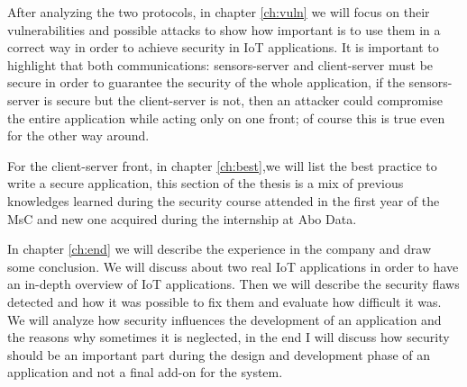 	After analyzing the two protocols, in chapter \ref{ch:vuln} we will focus on their vulnerabilities and possible attacks to show
	how important is to use them in a correct way in order to achieve security in IoT applications.\newline
	It is important to highlight that both communications: sensors-server and client-server must be secure in order to guarantee
	the security of the whole application, if the sensors-server is secure but the client-server is not, then an
	attacker could compromise the entire application while acting only on one front; of course this is true even for the other way around.\newline
	
	For the client-server front, in chapter \ref{ch:best},we will list the best practice to write a secure application, this section of the thesis
	is a mix of previous knowledges learned during the security course attended in the first year of the MsC and new one
	acquired during the internship at Abo Data.\newline
	
	In chapter \ref{ch:end} we will describe the experience in the company and draw some conclusion. We will discuss about two real IoT applications in order to have an in-depth overview of IoT applications.\newline
	Then we will describe the security flaws detected and how it was possible to fix them and evaluate how difficult it was.\newline
	We will analyze how security influences the development of an application and the reasons why sometimes it is neglected,
	in the end I will discuss how security should be an important part during the design and development phase of an application
	and not a final add-on for the system.\newline
	